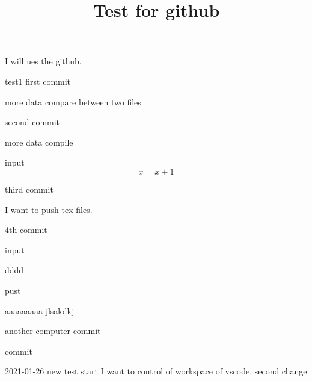 \documentclass[draft]{amsart}
\title{Test for github}
\theoremstyle{remark}
\begin{document}
\maketitle
I will ues the github.

test1
first commit

more data
compare between two files

second commit

more data
compile

input
\begin{equation*}
    x= x+1
\end{equation*}



third commit

I want to push tex files.


4th commit

input


dddd


pust

aaaaaaaaa
jlsakdkj

another computer
commit


commit

2021-01-26 new test start
I want to control of workspace of vscode.
second change
\end{document}

